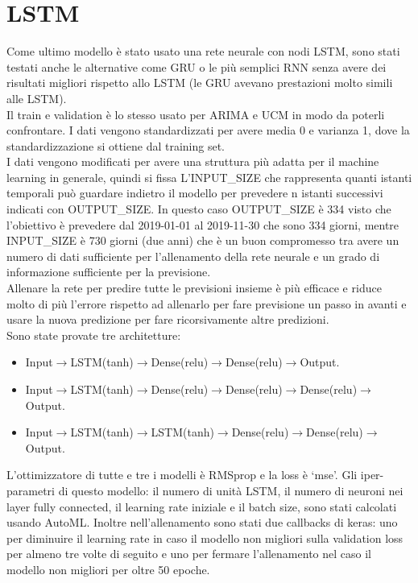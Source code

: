 \documentclass[12pt, onecolumn]{article}
\begin{document}
\section*{LSTM}
Come ultimo modello è stato usato una rete neurale con nodi LSTM, sono stati testati anche le alternative come GRU o le più semplici RNN senza avere dei risultati migliori rispetto allo LSTM (le GRU avevano prestazioni molto simili alle LSTM).\\
Il train e validation è lo stesso usato per ARIMA e UCM in modo da poterli confrontare.
I dati vengono standardizzati per avere media 0 e varianza 1, dove la standardizzazione si ottiene dal training set.\\
I dati vengono modificati per avere una struttura più adatta per il machine learning in generale, quindi si fissa L'INPUT\_SIZE che rappresenta quanti istanti temporali può guardare indietro il modello per prevedere n istanti successivi indicati con OUTPUT\_SIZE.
In questo caso OUTPUT\_SIZE è 334 visto che l'obiettivo è prevedere dal 2019-01-01 al 2019-11-30 che sono 334 giorni, mentre INPUT\_SIZE è 730 giorni (due anni) che è un buon compromesso tra avere un numero di dati sufficiente per l'allenamento della rete neurale e un grado di informazione sufficiente per la previsione.\\
Allenare la rete per predire tutte le previsioni insieme è più efficace e riduce molto di più l'errore rispetto ad allenarlo per fare previsione un passo in avanti e usare la nuova predizione per fare ricorsivamente altre predizioni.\\
Sono state provate tre architetture:
\begin{itemize}[leftmargin=*]
\item Input$\to$LSTM(tanh)$\to$Dense(relu)$\to$Dense(relu)$\to$Output.
\item Input$\to$LSTM(tanh)$\to$Dense(relu)$\to$Dense(relu)$\to$Dense(relu)$\to$Output.
\item Input$\to$LSTM(tanh)$\to$LSTM(tanh)$\to$Dense(relu)$\to$Dense(relu)$\to$Output.
\end{itemize}
L'ottimizzatore di tutte e tre i modelli è RMSprop e la loss è `mse'. Gli iper-parametri di questo modello: il numero di unità LSTM, il numero di neuroni nei layer fully connected, il learning rate iniziale e il batch size, sono stati calcolati usando AutoML.
Inoltre nell'allenamento sono stati due callbacks di keras: uno per diminuire il learning rate in caso il modello non migliori sulla validation loss per almeno tre volte di seguito e uno per fermare l'allenamento nel caso il modello non migliori per oltre 50 epoche.
\end{document}
